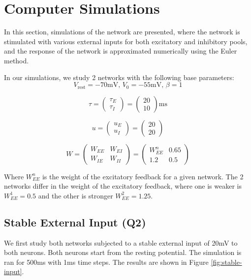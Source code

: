 \documentclass[10pt,twocolumn]{article}
\begin{document}

\section{Computer Simulations}
In this section, simulations of the network are presented,
where the network is stimulated with various external inputs for
both excitatory and inhibitory pools, and the
response of the network is approximated numerically using the Euler method.

In our simulations, we study 2 networks with the following base parameters:
$$
    V_{\text{rest}} = -70 \text{mV, } V_0 = -55 \text{mV, } \beta = 1
$$

$$
    \tau
    = \begin{pmatrix} \tau_E \\ \tau_I \end{pmatrix}
    = \begin{pmatrix} 20 \\ 10 \end{pmatrix}\text{ms}
$$

$$
    u
    = \begin{pmatrix} u_E \\ u_I \end{pmatrix}
    = \begin{pmatrix} 20 \\ 20 \end{pmatrix}
$$

$$
    W
    = \begin{pmatrix} W_{EE} & W_{EI} \\ W_{IE} & W_{II} \end{pmatrix}
    = \begin{pmatrix} W^n_{EE} & 0.65 \\ 1.2 & 0.5 \end{pmatrix}
$$

Where $W^n_{EE}$ is the weight of the excitatory feedback for a given network.
The 2 networks differ in the weight of the excitatory feedback, where one is weaker
is $W^1_{EE} = 0.5$ and the other is stronger $W^2_{EE} = 1.25$.

\subsection{Stable External Input (Q2)}
We first study both networks subjected to a stable external input of 20mV to
both neurons.
Both neurons start from the resting potential. The simulation is ran for 500ms
with 1ms time steps. The results are shown in Figure \ref{fig:stable-input}.
\end{document}
